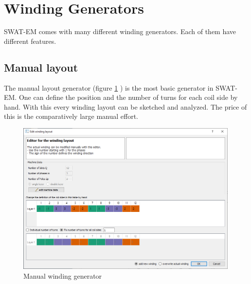 \documentclass[]{scrreprt}
\begin{document}
\section{Winding Generators}\label{sec:winding_generators}
SWAT-EM comes with many different winding generators. Each of them have different features.
%
%
\subsection{Manual layout}\label{sec:manual_generator}
%
The manual layout generator (figure \ref{fig:manual_layout_dialog} ) is the most basic generator in SWAT-EM. 
One can define the position and the number of turns for each coil side by hand. With this every winding layout 
can be sketched and analyzed. The price of this is the comparatively large manual effort.
%
\begin{figure}[htpb]
    \centering
    \includegraphics[width=0.99\textwidth,angle=0]{fig/manual_layout}
    \caption{Manual winding generator }
    \label{fig:manual_layout_dialog}
\end{figure}
%
\end{document}
